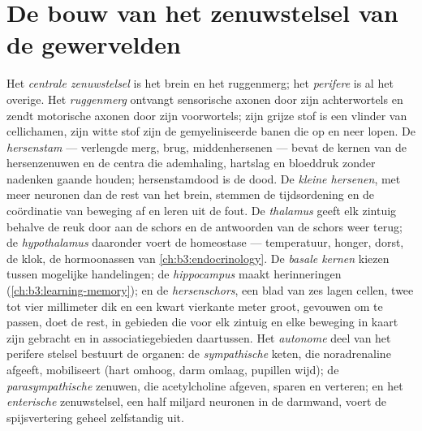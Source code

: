 \section{De bouw van het zenuwstelsel van de gewervelden}

\begin{definition}\label{def:b3:nervous-systems:plan}
Het \emph{centrale zenuwstelsel} is het brein en het ruggenmerg; het
\emph{perifere} is al het overige. Het \emph{ruggenmerg} ontvangt
sensorische axonen door zijn achterwortels en zendt motorische axonen
door zijn voorwortels; zijn grijze stof is een vlinder van
cellichamen, zijn witte stof zijn de gemyeliniseerde banen die op en
neer lopen. De \emph{hersenstam} --- verlengde merg, brug,
middenhersenen --- bevat de kernen van de hersenzenuwen en de centra
die ademhaling, hartslag en bloeddruk zonder nadenken gaande houden;
hersenstamdood is de dood. De \emph{kleine hersenen}, met meer neuronen
dan de rest van het brein, stemmen de tijdsordening en de coördinatie
van beweging af en leren uit de fout. De \emph{thalamus} geeft elk
zintuig behalve de reuk door aan de schors en de antwoorden van de
schors weer terug; de \emph{hypothalamus} daaronder voert de
homeostase --- temperatuur, honger, dorst, de klok, de hormoonassen van
\cref{ch:b3:endocrinology}. De \emph{basale kernen} kiezen tussen
mogelijke handelingen; de \emph{hippocampus} maakt herinneringen
(\cref{ch:b3:learning-memory}); en de \emph{hersenschors}, een blad van
zes lagen cellen, twee tot vier millimeter dik en een kwart vierkante
meter groot, gevouwen om te passen, doet de rest, in gebieden die voor
elk zintuig en elke beweging in kaart zijn gebracht en in
associatiegebieden daartussen. Het \emph{autonome} deel van het
perifere stelsel bestuurt de organen: de \emph{sympathische} keten, die
noradrenaline afgeeft, mobiliseert (hart omhoog, darm omlaag, pupillen
wijd); de \emph{parasympathische} zenuwen, die acetylcholine afgeven,
sparen en verteren; en het \emph{enterische} zenuwstelsel, een half
miljard neuronen in de darmwand, voert de spijsvertering geheel
zelfstandig uit.
\end{definition}

